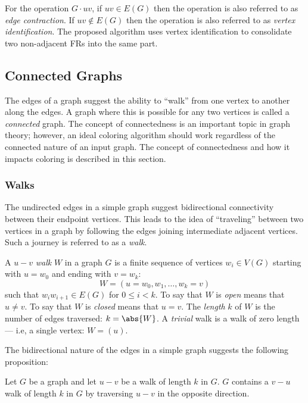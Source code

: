 For the operation \(G\cdot uv\), if \(uv\in E(G)\) then the operation is also referred to as \emph{edge
  contraction}.  If \(uv\notin E(G)\) then the operation is also referred to as \emph{vertex identification}.  The
proposed algorithm uses vertex identification to consolidate two non-adjacent FRs into the same part.

\subsection{Connected Graphs}

The edges of a graph suggest the ability to ``walk'' from one vertex to another along the edges.  A graph where this
is possible for any two vertices is called a \emph{connected} graph.  The concept of connectedness is an
important topic in graph theory; however, an ideal coloring algorithm should work regardless of the connected
nature of an input graph.  The concept of connectedness and how it impacts coloring is described in this section.

\subsubsection{Walks}

The undirected edges in a simple graph suggest bidirectional connectivity between their endpoint vertices.  This
leads to the idea of ``traveling'' between two vertices in a graph by following the edges joining intermediate
adjacent vertices.  Such a journey is referred to as a \emph{walk}.

A \(u-v\) \emph{walk} \(W\) in a graph \(G\) is a finite sequence of vertices \(w_i\in V(G)\) starting with
\(u=w_0\) and ending with \(v=w_k\):
\[W=(u=w_0,w_1,\ldots,w_k=v)\]
such that \(w_iw_{i+1}\in E(G)\) for \(0\le i<k\).  To say that \(W\) is \emph{open} means that \(u\ne v\).  To say
that \(W\) is \emph{closed} means that \(u=v\).  The \emph{length} \(k\) of \(W\) is the number of edges traversed:
\(k=\abs{W}\).  A \emph{trivial} walk is a walk of zero length --- i.e, a single vertex: \(W=(u)\).

The bidirectional nature of the edges in a simple graph suggests the following proposition:

\begin{proposition}
  Let \(G\) be a graph and let \(u-v\) be a walk of length \(k\) in \(G\).  \(G\) contains a \(v-u\) walk of length
  \(k\) in \(G\) by traversing \(u-v\) in the opposite direction.
\end{proposition}


